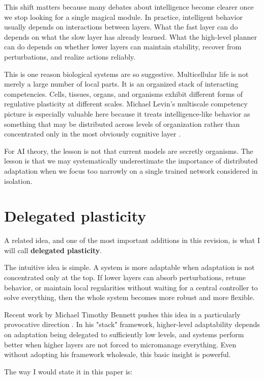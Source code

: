 \documentclass[11pt]{article}
\begin{document}
This shift matters because many debates about intelligence become clearer once we stop looking for a single magical module. In practice, intelligent behavior usually depends on interactions between layers. What the fast layer can do depends on what the slow layer has already learned. What the high-level planner can do depends on whether lower layers can maintain stability, recover from perturbations, and realize actions reliably.

This is one reason biological systems are so suggestive. Multicellular life is not merely a large number of local parts. It is an organized stack of interacting competencies. Cells, tissues, organs, and organisms exhibit different forms of regulative plasticity at different scales. Michael Levin's multiscale competency picture is especially valuable here because it treats intelligence-like behavior as something that may be distributed across levels of organization rather than concentrated only in the most obviously cognitive layer \citep{levin2023,mcmillen2024}.

For AI theory, the lesson is not that current models are secretly organisms. The lesson is that we may systematically underestimate the importance of distributed adaptation when we focus too narrowly on a single trained network considered in isolation.

\section{Delegated plasticity}


A related idea, and one of the most important additions in this revision, is what I will call \textbf{delegated plasticity}.

The intuitive idea is simple. A system is more adaptable when adaptation is not concentrated only at the top. If lower layers can absorb perturbations, retune behavior, or maintain local regularities without waiting for a central controller to solve everything, then the whole system becomes more robust and more flexible.

Recent work by Michael Timothy Bennett pushes this idea in a particularly provocative direction \citep{bennett2025}. In his "stack" framework, higher-level adaptability depends on adaptation being delegated to sufficiently low levels, and systems perform better when higher layers are not forced to micromanage everything. Even without adopting his framework wholesale, this basic insight is powerful.

The way I would state it in this paper is:
\end{document}
